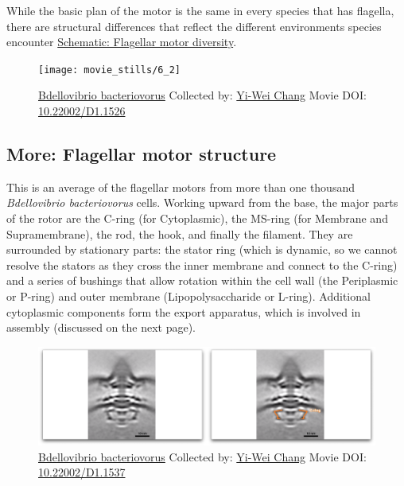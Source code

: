 \documentclass[]{tufte-book}
\begin{document}
While the basic plan of the motor is the same in every species that has
flagella, there are structural differences that reflect the different
environments species encounter
\protect\hyperlink{Flagellar_motor_diversity}{Schematic: Flagellar motor
diversity}.





\begin{figure}
\texttt{[image: movie\_stills/6\_2]} \caption[\protect\hyperlink{tree}{Bdellovibrio bacteriovorus} Collected
by: \protect\hyperlink{yi-wei_chang}{Yi-Wei Chang} Movie DOI:
\href{https://doi.org/10.22002/D1.1526}{10.22002/D1.1526}]{\protect\hyperlink{tree}{Bdellovibrio bacteriovorus} Collected
by: \protect\hyperlink{yi-wei_chang}{Yi-Wei Chang} Movie DOI:
\href{https://doi.org/10.22002/D1.1526}{10.22002/D1.1526}}\label{fig:6-2}
\end{figure}

\hypertarget{Flagellar_motor_structure}{\subsection*{More: Flagellar
motor structure}\label{Flagellar_motor_structure}}

This is an average of the flagellar motors from more than one thousand
\emph{Bdellovibrio bacteriovorus} cells. Working upward from the base,
the major parts of the rotor are the C-ring (for Cytoplasmic), the
MS-ring (for Membrane and Supramembrane), the rod, the hook, and finally
the filament. They are surrounded by stationary parts: the stator ring
(which is dynamic, so we cannot resolve the stators as they cross the
inner membrane and connect to the C-ring) and a series of bushings that
allow rotation within the cell wall (the Periplasmic or P-ring) and
outer membrane (Lipopolysaccharide or L-ring). Additional cytoplasmic
components form the export apparatus, which is involved in assembly
(discussed on the next page).





\begin{figure}
\includegraphics{movie_stills/6_2a} \caption[\protect\hyperlink{tree}{Bdellovibrio bacteriovorus}
Collected by: \protect\hyperlink{yi-wei_chang}{Yi-Wei Chang} Movie DOI:
\href{https://doi.org/10.22002/D1.1537}{10.22002/D1.1537}]{\protect\hyperlink{tree}{Bdellovibrio bacteriovorus}
Collected by: \protect\hyperlink{yi-wei_chang}{Yi-Wei Chang} Movie DOI:
\href{https://doi.org/10.22002/D1.1537}{10.22002/D1.1537}}\label{fig:6-2a}
\end{figure}
\end{document}
